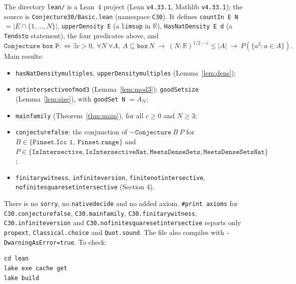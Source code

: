 \documentclass[11pt]{article}
\theoremstyle{definition}
\theoremstyle{remark}
\renewcommand{\_}{\oldus\allowbreak}
\begin{document}
The directory \texttt{lean/} is a Lean~4 project (Lean \texttt{v4.33.1}, Mathlib \texttt{v4.33.1}); the
source is \texttt{Conjecture30/Basic.lean} (namespace \texttt{C30}). It defines
\texttt{countIn E N} $=|E\cap\{1,\dots,N\}|$, \texttt{upperDensity E} (a \texttt{limsup} in $\mathbb R$),
\texttt{HasNatDensity E d} (a \texttt{Tendsto} statement), the four predicates above, and
\[
  \texttt{Conjecture box P} :\iff \exists c>0,\ \forall N\ \forall A,\ A\subseteq \texttt{box}\,N\ \to\
  (N:\mathbb R)^{1/2-c}\le |A|\ \to\ P(\{a^2 : a\in A\}).
\]
Main results:
\begin{itemize}
  \item \texttt{hasNatDensity\_multiples}, \texttt{upperDensity\_multiples} (Lemma~\ref{lem:dens});
  \item \texttt{not\_intersective\_of\_mod3} (Lemma~\ref{lem:mod3}); \texttt{goodSet\_size}
        (Lemma~\ref{lem:size}), with \texttt{goodSet N} $=A_N$;
  \item \texttt{main\_family} (Theorem~\ref{thm:main}), for all $c\ge0$ and $N\ge3$;
  \item \texttt{conjecture\_false}: the conjunction of
        $\neg\,\texttt{Conjecture}\ B\ P$ for $B\in\{\texttt{Finset.Icc 1},\ \texttt{Finset.range}\}$ and
        $P\in\{\texttt{IsIntersective},\texttt{IsIntersectiveNat},\texttt{MeetsDenseSets},
        \texttt{MeetsDenseSetsNat}\}$;
  \item \texttt{finitary\_witness}, \texttt{infinite\_version}, \texttt{finite\_not\_intersective},
        \texttt{no\_finite\_square\_set\_intersective} (Section 4).
\end{itemize}
There is no \texttt{sorry}, no \texttt{native\_decide} and no added axiom. \texttt{\#print axioms} for
\texttt{C30.conjecture\_false}, \texttt{C30.main\_family}, \texttt{C30.finitary\_witness},
\texttt{C30.infinite\_version} and \texttt{C30.no\_finite\_square\_set\_intersective} reports only
\texttt{propext}, \texttt{Classical.choice} and \texttt{Quot.sound}. The file also compiles with
\texttt{-DwarningAsError=true}. To check:
\begin{verbatim}
cd lean
lake exe cache get
lake build
\end{verbatim}
\end{document}
